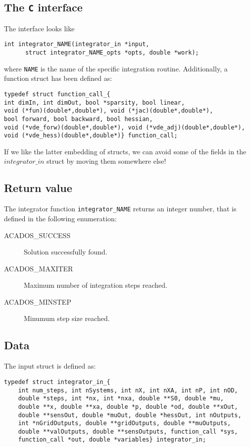 \documentclass{report}
\begin{document}
\subsection{The \texttt{C} interface}
The interface looks like
\begin{verbatim}
int integrator_NAME(integrator_in *input, 
      struct integrator_NAME_opts *opts, double *work);
\end{verbatim}
where \texttt{NAME} is the name of the specific integration routine. Additionally, a function struct has been defined as:
\begin{verbatim}
typedef struct function_call_{
int dimIn, int dimOut, bool *sparsity, bool linear, 
void (*fun)(double*,double*), void (*jac)(double*,double*), 
bool forward, bool backward, bool hessian,
void (*vde_forw)(double*,double*), void (*vde_adj)(double*,double*),
void (*vde_hess)(double*,double*)} function_call;
\end{verbatim}
If we like the latter embedding of structs, we can avoid some of the fields in the $integrator\_in$ struct by moving them somewhere else!

\subsection{Return value}
The integrator function \texttt{integrator\_NAME} returns an integer number, that is defined in the following enumeration:
\begin{description}
	\item[ACADOS\_SUCCESS] Solution successfully found.
	\item[ACADOS\_MAXITER] Maximum number of integration steps reached.
	\item[ACADOS\_MINSTEP] Minumum step size reached.
\end{description}

\subsection{Data}
The input struct is defined as:
\begin{verbatim}
typedef struct integrator_in_{
    int num_steps, int nSystems, int nX, int nXA, int nP, int nOD,
    double *steps, int *nx, int *nxa, double **S0, double *mu,
    double **x, double **xa, double *p, double *od, double **xOut, 
    double **sensOut, double *muOut, double *hessOut, int nOutputs,
    int *nGridOutputs, double **gridOutputs, double **muOutputs, 
    double **valOutputs, double **sensOutputs, function_call *sys, 
    function_call *out, double *variables} integrator_in;
\end{verbatim}
\end{document}
